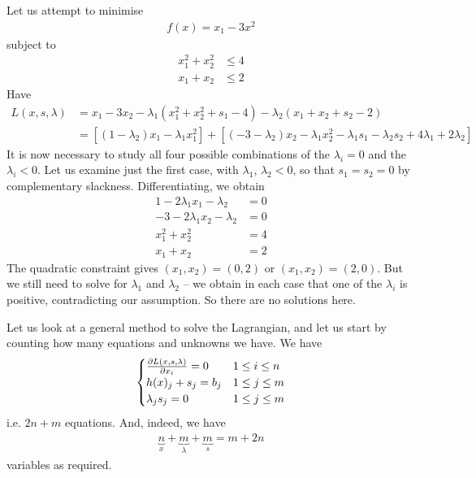 \documentclass{../../template/note}
\begin{document}
    \begin{example*}
        Let us attempt to minimise
        \begin{align*}
            f(x) = x_1-3x^2
        \end{align*}
        subject to
        \begin{align*}
            x_1^2+x_2^2 &\leq 4 \\
            x_1+x_2 &\leq 2
        \end{align*}
        Have
        \begin{align*}
            L(x, s, \lambda) &= x_1 - 3x_2 - \lambda_1(x_1^2+x_2^2+s_1-4) - \lambda_2(x_1+x_2+s_2-2) \\
            &= [(1-\lambda_2)x_1 - \lambda_1x_1^2] + [(-3-\lambda_2)x_2-\lambda_1x_2^2 - \lambda_1s_1 - \lambda_2s_2 + 4\lambda_1 + 2\lambda_2]
        \end{align*}
        It is now necessary to study all four possible combinations of the $\lambda_i = 0$ and the $\lambda_i < 0$. Let us examine just the first case, with $\lambda_1$, $\lambda_2 < 0$, so that $s_1 = s_2 = 0$ by complementary slackness. Differentiating, we obtain
        \begin{align*}
            1-2\lambda_1x_1-\lambda_2 &= 0 \\
            -3-2\lambda_1x_2-\lambda_2 &= 0 \\
            x_1^2+x_2^2 &= 4 \\
            x_1+x_2 &= 2
        \end{align*}
        The quadratic constraint gives $(x_1, x_2) = (0, 2)$ or $(x_1, x_2) = (2, 0)$. But we still need to solve for $\lambda_1$ and $\lambda_2$ -- we obtain in each case that one of the $\lambda_i$ is positive, contradicting our assumption. So there are no solutions here.        
    \end{example*}
    

    Let us look at a general method to solve the Lagrangian, and let us start by counting how many equations and unknowns we have. We have
    \begin{align*}
        \begin{cases}
            \pd{L(x,s,\lambda)}{x_i} = 0 & 1 \leq i \leq n\\
            h(x)_j + s_j = b_j & 1 \leq j \leq m \\
            \lambda_j s_j = 0 & 1 \leq j \leq m
        \end{cases}
    \end{align*}
    i.e. $2n+m$ equations. And, indeed, we have
    \begin{align*}
        \underbrace n_x + \underbrace m_\lambda + \underbrace m_s = m+2n
    \end{align*}
    variables as required.
\end{document}
